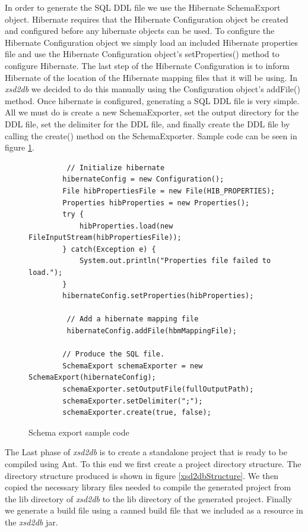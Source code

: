 In order to generate the SQL DDL file we use the Hibernate SchemaExport object.  Hibernate requires that the Hibernate Configuration object be created and configured before any hibernate objects can be used.  To configure the Hibernate Configuration object we simply load an included Hibernate properties file and use the Hibernate Configuration object's setProperties() method to configure Hibernate.  The last step of the Hibernate Configuration is to inform Hibernate of the location of the Hibernate mapping files that it will be using.  In \emph{xsd2db} we decided to do this manually using the Configuration object's addFile() method.   Once hibernate is configured, generating a SQL DDL file is very simple.  All we must do is create a new SchemaExporter, set the output directory for the DDL file, set the delimiter for the DDL file, and finally create the DDL file by calling the create() method on the SchemaExporter.  Sample code can be seen in figure \ref{schemaExportSampleCode}.
\begin{figure}[htbp]
\begin{center}
\begin{verbatim}
         // Initialize hibernate
        hibernateConfig = new Configuration();
        File hibPropertiesFile = new File(HIB_PROPERTIES);
        Properties hibProperties = new Properties();
        try {
            hibProperties.load(new FileInputStream(hibPropertiesFile));
        } catch(Exception e) {
            System.out.println("Properties file failed to load.");
        }
        hibernateConfig.setProperties(hibProperties);

         // Add a hibernate mapping file
         hibernateConfig.addFile(hbmMappingFile);
         
        // Produce the SQL file.
        SchemaExport schemaExporter = new SchemaExport(hibernateConfig);
        schemaExporter.setOutputFile(fullOutputPath);
        schemaExporter.setDelimiter(";");
        schemaExporter.create(true, false);
\end{verbatim}
\caption{Schema export sample code}
\label{schemaExportSampleCode}
\end{center}
\end{figure}

The Last phase of \emph{xsd2db} is to create a standalone project that is ready to be compiled using Ant.  To this end we first create a project directory structure. The directory structure produced is shown in figure \ref{xsd2dbStructure}.  We then copied the necessary library files needed to compile the generated project from the lib directory of \emph{xsd2db} to the lib directory of the generated project.  Finally we generate a build file using a canned build file that we included as a resource in the \emph{xsd2db} jar.   

